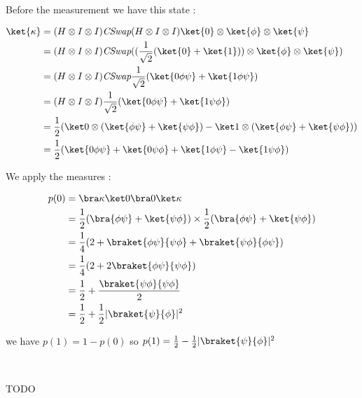 ~

Before the measurement we have this state :

\begin{align*}
  \ket{\kappa}&=(H \otimes I \otimes I) \CSwap (H \otimes I \otimes I) \ket{0} \otimes
  \ket{\phi} \otimes \ket{\psi} \\
  &= (H \otimes I \otimes I) \CSwap ((\frac{1}{\sqrt 2}(\ket{0} + \ket{1}))
  \otimes \ket{\phi} \otimes \ket{\psi}) \\
  &= (H \otimes I \otimes I) \CSwap \frac{1}{\sqrt 2}
     (\ket{0\phi\psi} + \ket{1\phi\psi}) \\
  &= (H \otimes I \otimes I)\frac{1}{\sqrt 2}
     (\ket{0\phi\psi} + \ket{1\psi\phi}) \\
  &= \frac 1 2(\ket 0 \otimes (\ket{\phi\psi} + \ket{\psi\phi}) -
               \ket 1 \otimes (\ket{\phi\psi} + \ket{\psi\phi})) \\
  &= \frac 1 2(\ket{0\phi\psi} + \ket{0\psi\phi} +
               \ket{1\phi\psi} - \ket{1\psi\phi})
\end{align*}

We apply the measures :

\begin{align*}
  p(0) &= \bra \kappa \ket 0 \bra 0 \ket \kappa \\
  &= \frac 1 2 (\bra{\phi\psi} + \ket{\psi\phi}) \times
     \frac 1 2 (\bra{\phi\psi} + \ket{\psi\phi}) \\
  &= \frac 1 4 (2 + \braket{\phi\psi}{\psi\phi} + \braket{\psi\phi}{\phi\psi})\\
  &= \frac 1 4 (2 + 2\braket{\phi\psi}{\psi\phi})\\
  &= \frac 1 2 + \frac{\braket{\psi\phi}{\psi\phi}}{2}\\
  &= \frac 1 2 + \frac 1 2 |\braket{\psi}{\phi}|^2\\
\end{align*}

we have $p(1) = 1 - p(0)$ so $p(1) = \frac 1 2 - \frac 1 2
|\braket{\psi}{\phi}|^2$

~

TODO


